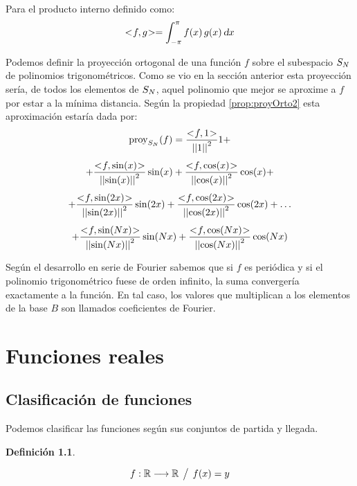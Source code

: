 \documentclass[a5paper,12pt,twoside]{book}
\newtheorem{defn}{{Definición}}[chapter]
\begin{document}
Para el producto interno definido como:
\begin{equation*}
    <\hspace{-0.8mm}f,g\hspace{-0.8mm}> = \int_{-\pi}^\pi f(x) \, g(x) \, \textsl{d} x
\end{equation*}

Podemos definir la proyección ortogonal de una función $f$ sobre el subespacio $S_N$ de polinomios trigonométricos.
Como se vio en la sección anterior esta proyección sería, de todos los elementos de $S_N$, aquel polinomio que mejor se aproxime a $f$ por estar a la mínima distancia.
Según la propiedad \ref{prop:proyOrto2} esta aproximación estaría dada por:
\begin{multline*}
    \proy_{S_\Nth}(f) = \frac{\intProd{f}{1}}{\nnorm{1}^2} 1 +
    \\[1ex]
    + \frac{\intProd{f}{\sin(x)}}{\nnorm{\sin(x)}^2} \sin(x) + \frac{\intProd{f}{\cos(x)}}{\nnorm{\cos(x)}^2} \cos(x) +
    \\[1ex]
    + \frac{\intProd{f}{\sin(2x)}}{\nnorm{\sin(2x)}^2} \sin(2x) + \frac{\intProd{f}{\cos(2x)}}{\nnorm{\cos(2x)}^2} \cos(2x) + \dots
    \\[1ex]
    + \frac{\intProd{f}{\sin(\Nth x)}}{\nnorm{\sin(\Nth x)}^2} \sin(\Nth x) + \frac{\intProd{f}{\cos(\Nth x)}}{\nnorm{\cos(\Nth x)}^2} \cos(\Nth x)
\end{multline*}

Según el desarrollo en serie de Fourier sabemos que si $f$ es periódica y si el polinomio trigonométrico fuese de orden infinito, la suma convergería exactamente a la función.
En tal caso, los valores que multiplican a los elementos de la base $B$ son llamados coeficientes de Fourier.


\chapter{Funciones reales}


\section{Clasificación de funciones}

Podemos clasificar las funciones según sus conjuntos de partida y llegada.

\begin{mdframed}[style=DefinitionFrame]
    \begin{defn}
    \end{defn}
    \begin{equation*}
        f:\mathbb{R} \longrightarrow \mathbb{R} \hspace{1ex} \big/ \hspace{1ex} f(x)=y
    \end{equation*}
\end{mdframed}
\end{document}

